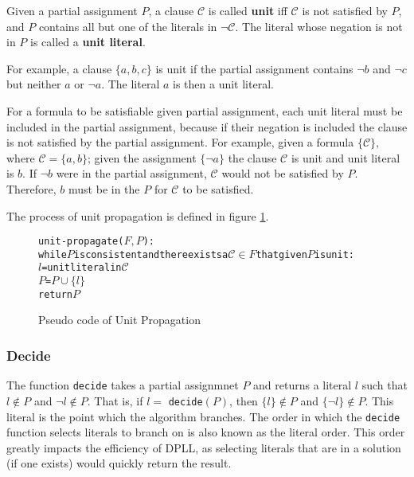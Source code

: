 \begin{defs}
Given a partial assignment $P$, a clause $\mathcal{C}$ is called \textbf{unit} iff $\mathcal{C}$ is not satisfied by $P$, and $P$ contains all but one of the literals in $\neg \mathcal{C}$.
The literal whose negation is not in $P$ is called a \textbf{unit literal}. 
\end{defs}

For example, a clause $\{a,b,c\}$ is unit if the partial assignment contains $\neg b$ and $\neg c$ but neither $a$ or $\neg a$.
The literal $a$ is then a unit literal.

For a formula to be satisfiable given partial assignment, each unit literal must be included in the partial assignment,
because if their negation is included the clause is not satisfied by the partial assignment.
For example, given a formula $\{\mathcal{C}\}$, where $\mathcal{C} = \{a,b\}$;
given the assignment $\{\neg a\}$ the clause $\mathcal{C}$ is unit and unit literal is $b$.
If $\neg b$ were in the partial assignment, $\mathcal{C}$ would not be satisfied by $P$.
Therefore, $b$ must be in the $P$ for $\mathcal{C}$ to be satisfied.

The process of unit propagation is defined in figure \ref{impl.propagation}.
\begin{figure}[htp]
\begin{center}
\begin{alltt}
unit-propagate(\(F, P\)):
  while \(P\) is consistent and there exists a \(\mathcal{C} \in F\) that given \(P\) is unit:
    \(l\) = unit literal in \(\mathcal{C}\)
    \(P\) = \(P \cup \{l\}\)
  return \(P\)
\end{alltt}
  \caption{Pseudo code of Unit Propagation}
  \label{impl.propagation}
\end{center}
\end{figure}

\subsubsection{Decide}
\label{impl.litorder}
The function \verb+decide+ takes a partial assignmnet $P$ and returns a literal $l$ such that $l \not \in P$ and $\neg l \not \in P$.
That is, if $l =$ \verb+decide+$(P)$, then $\{l\} \not \in P$ and $\{\neg l\} \not \in P$.
This literal is the point which the algorithm branches.
The order in which the \verb+decide+ function selects literals to branch on is also known as the literal order.
This order greatly impacts the efficiency of DPLL, as selecting literals that are in a solution (if one exists) would quickly return the result.

